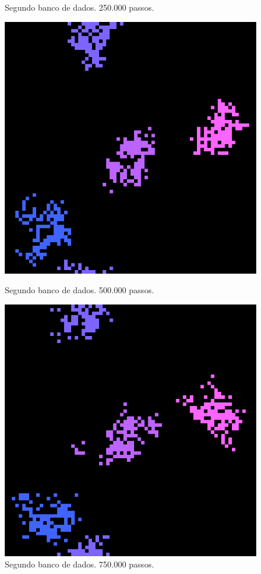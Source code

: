 \documentclass[conference]{IEEEtran}
\begin{document}
\begin{figure}[H]
\begin{minipage}[b]{0.5\linewidth}
    \caption{Segundo banco de dados. 250.000 passos.} 
    \vspace{4ex}
  \end{minipage} 
  \begin{minipage}[b]{0.5\linewidth}
    \centering
    \includegraphics[width=.8\linewidth]{resultados/data/dataset_two/2-2.png} 
    \caption{Segundo banco de dados. 500.000 passos.} 
    \vspace{4ex}
  \end{minipage}%
  \begin{minipage}[b]{0.5\linewidth}
    \centering
    \includegraphics[width=.8\linewidth]{resultados/data/dataset_two/2-3.png} 
    \caption{Segundo banco de dados. 750.000 passos.} 
    \vspace{4ex}
  \end{minipage}
\end{figure}
\end{document}
